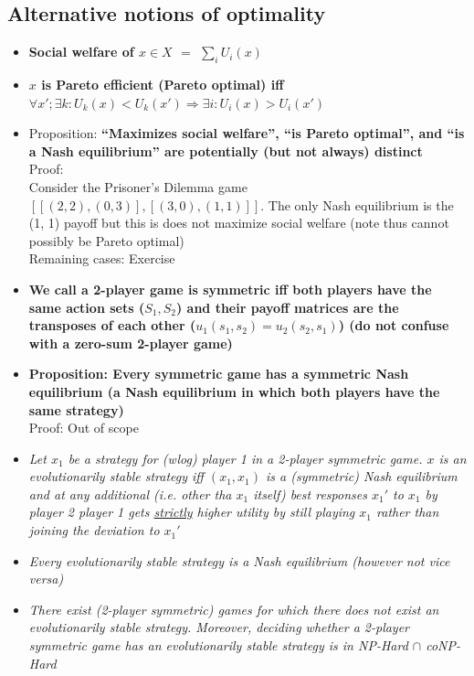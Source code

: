 \documentclass[20pt,a4paper,landscape]{extarticle}
\begin{document}
\begin{flushleft}
\subsection{Alternative notions of optimality}
\begin{itemize}
\item \textbf{Social welfare of \boldmath$x \in X$ $=$ $\sum_i U_i(x)$}
\item \textbf{\boldmath$x$ is Pareto efficient (Pareto optimal) iff $\forall x'; \exists k: U_k(x) < U_k(x') \Rightarrow \exists i: U_i(x) > U_i(x')$}
\item Proposition: \textbf{``Maximizes social welfare'', ``is Pareto optimal'', and ``is a Nash equilibrium'' are potentially (but not always) distinct}\\
Proof:\\
Consider the Prisoner's Dilemma game $[[(2, 2), (0, 3)], [(3, 0), (1,1)]]$. The only Nash equilibrium is the (1, 1) payoff but this is does not maximize social welfare (note thus cannot possibly be Pareto optimal)\\
Remaining cases: Exercise
\clearpage
\item \textbf{We call a 2-player game is symmetric iff both players have the same action sets (\boldmath$S_1, S_2$) and their payoff matrices are the transposes of each other ($u_1(s_1, s_2)=u_2(s_2, s_1)$) (do not confuse with a zero-sum 2-player game)}
\item \textbf{Proposition: Every symmetric game has a symmetric Nash equilibrium (a Nash equilibrium in which both players have the same strategy)}\\
Proof: Out of scope
\item \textit{Let $x_1$ be a strategy for (wlog) player 1 in a 2-player symmetric game. $x$ is an evolutionarily stable strategy iff $(x_1, x_1)$ is a (symmetric) Nash equilibrium and at any additional (i.e. other tha $x_1$ itself) best responses $x_1'$ to $x_1$ by player 2 player 1 gets \underline{strictly} higher utility by still playing $x_1$ rather than joining the deviation to $x_1'$}
\item \textit{Every evolutionarily stable strategy is a Nash equilibrium (however not vice versa)}
\item \textit{There exist (2-player symmetric) games for which there does not exist an evolutionarily stable strategy. Moreover, deciding whether a 2-player symmetric game has an evolutionarily stable strategy is in NP-Hard $\cap$ coNP-Hard}
\end{itemize}
\clearpage

\end{flushleft}
\end{document}
